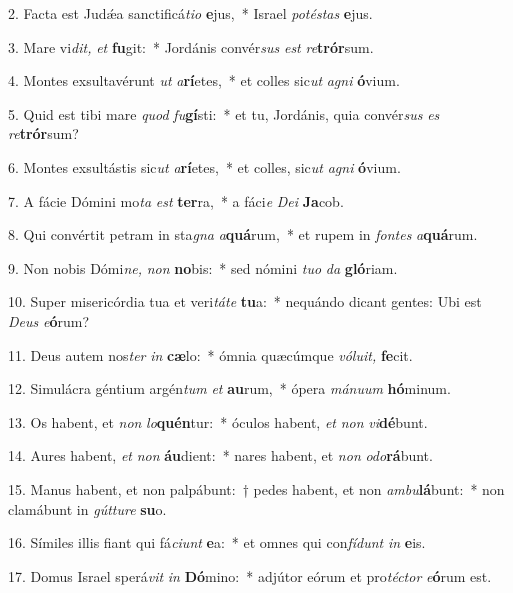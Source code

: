 \item 2. Facta est Judǽa sanctificá\textit{tio} \textbf{e}jus,~* Israel \textit{potéstas} \textbf{e}jus.
\item 3. Mare vi\textit{dit,} \textit{et} \textbf{fu}git:~* Jordánis convér\textit{sus} \textit{est} \textit{re}\textbf{trór}sum.
\item 4. Montes exsultavérunt \textit{ut} \textit{a}\textbf{rí}etes,~* et colles sic\textit{ut} \textit{agni} \textbf{ó}vium.
\item 5. Quid est tibi mare \textit{quod} \textit{fu}\textbf{gí}sti:~* et tu, Jordánis, quia convér\textit{sus} \textit{es} \textit{re}\textbf{trór}sum?
\item 6. Montes exsultástis sic\textit{ut} \textit{a}\textbf{rí}etes,~* et colles, sic\textit{ut} \textit{agni} \textbf{ó}vium.
\item 7. A fácie Dómini mo\textit{ta} \textit{est} \textbf{ter}ra,~* a fáci\textit{e} \textit{Dei} \textbf{Ja}cob.
\item 8. Qui convértit petram in sta\textit{gna} \textit{a}\textbf{quá}rum,~* et rupem in \textit{fontes} \textit{a}\textbf{quá}rum.
\item 9. Non nobis Dómi\textit{ne,} \textit{non} \textbf{no}bis:~* sed nómini \textit{tuo} \textit{da} \textbf{gló}riam.
\item 10. Super misericórdia tua et veri\textit{táte} \textbf{tu}a:~* nequándo dicant gentes: Ubi est \textit{Deus} \textit{e}\textbf{ó}rum?
\item 11. Deus autem nos\textit{ter} \textit{in} \textbf{cæ}lo:~* ómnia quæcúmque \textit{vóluit,} \textbf{fe}cit.
\item 12. Simulácra géntium argén\textit{tum} \textit{et} \textbf{au}rum,~* ópera \textit{mánuum} \textbf{hó}minum.
\item 13. Os habent, et \textit{non} \textit{lo}\textbf{quén}tur:~* óculos habent, \textit{et} \textit{non} \textit{vi}\textbf{dé}bunt.
\item 14. Aures habent, \textit{et} \textit{non} \textbf{áu}dient:~* nares habent, et \textit{non} \textit{odo}\textbf{rá}bunt.
\item 15. Manus habent, et non palpábunt:~† pedes habent, et non \textit{ambu}\textbf{lá}bunt:~* non clamábunt in \textit{gútture} \textbf{su}o.
\item 16. Símiles illis fiant qui fá\textit{ciunt} \textbf{e}a:~* et omnes qui con\textit{fídunt} \textit{in} \textbf{e}is.
\item 17. Domus Israel sperá\textit{vit} \textit{in} \textbf{Dó}mino:~* adjútor eórum et pro\textit{téctor} \textit{e}\textbf{ó}rum est.
